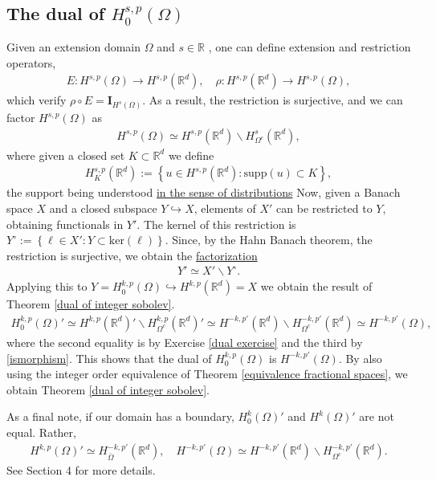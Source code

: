\documentclass[
    a4paper,
    DIV=14,
    abstract=true,
    numbers=noenddot
]
{scrartcl}
\theoremstyle{definition}
\newcommand{\set}[1]{\left\{#1\right\}}
\newcommand{\Id}{\bm{I}}\renewcommand{\ker}{\bm{ker}}\newcommand{\supp}[1]{\bm{supp}(#1)}\renewcommand{\tr}[1]{\mathrm{tr}\left(#1\right)}
\newcommand{\rm}[1]{\mathrm{#1}}
\newcommand{\R}{\mathbb{R}}
\begin{document}
\subsection{The dual of $H^{s,p}_0(\Omega)$}
Given an extension domain $\Omega $ and $s \in \R$ , one can define extension and restriction operators,
\begin{align*}
    E:H^{s,p}(\Omega ) \to H^{s,p}(\R^d), \quad \rho: H^{s,p}(\R^d) \to H^{s,p}(\Omega ),
\end{align*}
which verify $\rho \circ E = \Id_{H^s(\Omega )}$. As a result, the restriction is surjective, and we can factor $H^{s,p}(\Omega )$ as
\begin{align}\label{ismorphism}
    H^{s,p}(\Omega )\simeq H^{s,p}(\R^d)\backslash H^s_{\Omega^c}(\R^d ),
\end{align}
where given a closed set $K \subset \R^d$ we define
\begin{align*}
    H^{s,p}_K(\R^d):= \set{u \in H^{s,p}(\R^d): \rm{supp}(u) \subset K},
\end{align*}
the support being understood \href{https://nowheredifferentiable.com/2023-07-12-PDEs-3-Sobolev_spaces/#:~:text=Support%20of%20a%20distribution}{in the sense of distributions}
Now, given a Banach space $X$ and a closed subspace $Y \hookrightarrow X$, elements of $X'$ can be restricted to $Y$, obtaining functionals in $Y'$. The kernel of this restriction is $Y^\circ:=\set{\ell \in X': Y \subset \rm{ker}(\ell)}$. Since, by the Hahn Banach theorem, the restriction is surjective, we obtain the \href{https://math.la.asu.edu/~quigg/teach/courses/578/2008/notes/adjoints.pdf}{factorization}
\begin{align}\label{dual isomormphism}
    Y' \simeq X'\backslash Y^\circ.
\end{align}
Applying this to $Y= H^{k,p}_0(\Omega )\hookrightarrow H^{k,p}(\R^d) =X$ we obtain the result of Theorem \ref{dual of integer sobolev}.
\begin{align*}
    H^{k,p}_0(\Omega )' \simeq H^{k,p}(\R^d)'\backslash H^{k,p}_{\Omega^c}(\R^d)'\simeq H^{-k,p'}(\R^d)\backslash H^{-k,p'}_{\Omega^c}(\R^d )\simeq H^{-k,p'}(\Omega ),
\end{align*}
where the second equality is by Exercise \ref{dual exercise} and the third by \eqref{ismorphism}.
This shows that the dual of $H^{k,p}_0(\Omega )$ is $H^{-k,p'}(\Omega )$. By also using the integer order equivalence of Theorem \ref{equivalence fractional spaces}, we obtain  Theorem \ref{dual of integer sobolev}.

As a final note, if our domain has a boundary, $H_0^k(\Omega )'$ and $H^k(\Omega )'$ are not equal. Rather,
\begin{align*}
    H^{k,p}(\Omega )'\simeq H_{\overline{\Omega } }^{-k,p'}(\R^d), \quad H^{-k,p'}(\Omega ) \simeq H^{-k,p'}(\R^d)\backslash H^{-k,p'}_{\Omega ^c }(\R^d).
\end{align*}
See \cite{taylor2013partial} Section 4 for more details.
\end{document}
